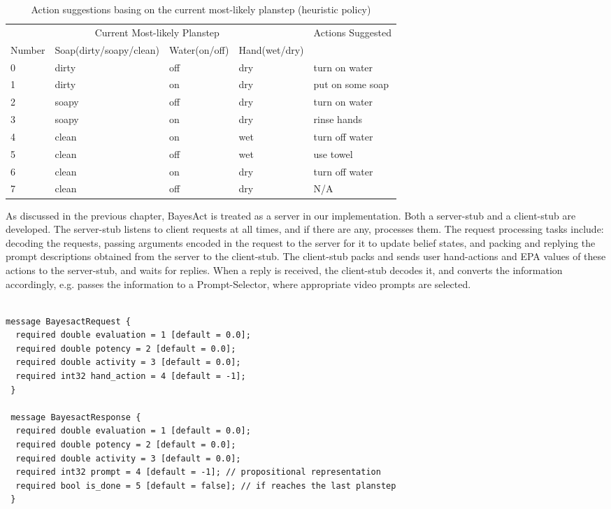 %
\begin{table}
\centering
\caption{Action suggestions basing on the current most-likely planstep (heuristic policy)}
\label{table:heuristic-policy}
\begin{tabular}{| l | l | l | l | l |}
\hline
\multicolumn{4}{|c|}{Current Most-likely Planstep} & \multirow{2}{*}{ Actions Suggested} \\ \cline{1-4} 
Number & Soap(dirty/soapy/clean) & Water(on/off) & Hand(wet/dry) & \\ \hline
0 & dirty & off & dry & turn on water \\ \hline
1 & dirty & on & dry & put on some soap \\ \hline
2 & soapy & off & dry & turn on water \\ \hline
3 & soapy & on & dry & rinse hands \\ \hline
4 & clean & on & wet & turn off water \\ \hline
5 & clean & off & wet & use towel \\ \hline
6 & clean & on & dry & turn off water \\ \hline
7 & clean & off & dry & N/A \\ \hline
\end{tabular}
\end{table}

As discussed in the previous chapter, BayesAct is treated as a server in our implementation. Both a server-stub and a client-stub are developed. The server-stub listens to client requests at all times, and if there are any, processes them. The request processing tasks include: decoding the requests, passing arguments encoded in the request to the server for it to update belief states, and packing and replying the prompt descriptions obtained from the server to the client-stub. The client-stub packs and sends user hand-actions and EPA values of these actions to the server-stub, and waits for replies. When a reply is received, the client-stub decodes it, and converts the information accordingly, e.g. passes the information to a Prompt-Selector, where appropriate video prompts are selected.

\begin{verbatim}

message BayesactRequest {
  required double evaluation = 1 [default = 0.0];
  required double potency = 2 [default = 0.0];
  required double activity = 3 [default = 0.0];
  required int32 hand_action = 4 [default = -1];
 }
 
 message BayesactResponse {
  required double evaluation = 1 [default = 0.0];
  required double potency = 2 [default = 0.0];
  required double activity = 3 [default = 0.0];
  required int32 prompt = 4 [default = -1]; // propositional representation  
  required bool is_done = 5 [default = false]; // if reaches the last planstep
 }

\end{verbatim}


